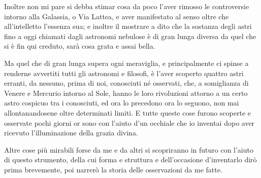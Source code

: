 \documentclass[11pt,twoside,openany]{book}
\begin{document}
Inoltre non mi pare si debba stimar cosa da poco l'aver rimosso le controversie intorno alla Galassia, o Via Lattea, e aver manifestato al senso oltre che all'intelletto l'essenza sua; e inoltre il mostrare a dito che la sostanza degli astri fino a oggi chiamati dagli astronomi nebulose è di gran lunga diversa da quel che si è fin qui creduto, sarà cosa grata e assai bella.

Ma quel che di gran lunga supera ogni meraviglia, e principalmente ci spinse a renderne avvertiti tutti gli astronomi e filosofi, è l'aver scoperto quattro astri erranti, da nessuno, prima di noi, conosciuti né osservati, che, a somiglianza di Venere e Mercurio intorno al Sole, hanno le loro rivoluzioni attorno a un certo astro cospicuo tra i conosciuti, ed ora lo precedono ora lo seguono, non mai allontanandosene oltre determinati limiti. E tutte queste cose furono scoperte e osservate pochi giorni or sono con l'aiuto d'un occhiale che io inventai dopo aver ricevuto l'illuminazione della grazia divina.

Altre cose più mirabili forse da me e da altri si scopriranno in futuro con l'aiuto di questo strumento, della cui forma e struttura e dell'occasione d'inventarlo dirò prima brevemente, poi narrerò la storia delle osservazioni da me fatte.
\end{document}
